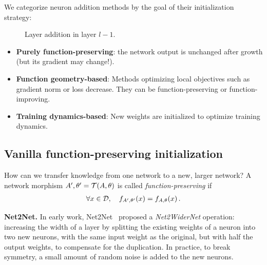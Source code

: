 We categorize neuron addition methods by the goal of their initialization strategy:
\begin{figure}
    \centering
    \begin{minipage}[t]{0.48\linewidth}
        \centering
        
        \caption{Width addition in layer $l-1$.}
        \label{fig:width-addition}
    \end{minipage}
    \hfill
    \begin{minipage}[t]{0.48\linewidth}
        \centering
        
        \caption{Layer addition in layer $l-1$.}
        \label{fig:layer-addition}
    \end{minipage}
\end{figure}
\begin{itemize}\itemsep0em
    \item \textbf{Purely function-preserving}: the network output is unchanged after growth (but its gradient may change!).
    \item \textbf{Function geometry-based}: Methods optimizing local objectives such as gradient norm or loss decrease. They can be function-preserving or function-improving.
    \item \textbf{Training dynamics-based}: New weights are initialized to optimize training dynamics.
\end{itemize}

\subsection{Vanilla function-preserving initialization}
\label{sec:function_preserving}

How can we transfer knowledge from one network to a new, larger network? A network morphism $A', \theta' = \mathcal{T}(A, \theta)$ is called \emph{function-preserving} if
\begin{align}
    \forall  x \in \mathcal{D}, \quad f_{A', \theta'}(x) = f_{A, \theta}(x) \, .
\end{align}

\textbf{Net2Net.} In early work, Net2Net~\citep{chen_net2net_2016} proposed a \emph{Net2WiderNet} operation: increasing the width of a layer by splitting the existing weights of a neuron into two new neurons, with the same input weight as the original, but with half the output weights, to compensate for the duplication. In practice, to break symmetry, a small amount of random noise is added to the new neurons.

